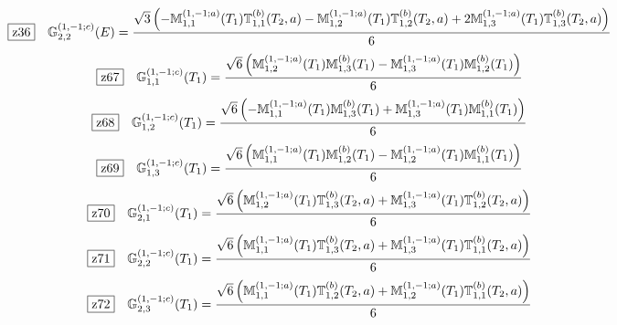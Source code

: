 \documentclass[fleqn,10pt,landscape]{jsarticle}
\begin{document}
\begin{dmath*}
\hspace*{3mm}\fbox{z36}\quad \mathbb{G}_{2,2}^{(1,-1;c)}(E)=\frac{\sqrt{3} \left(- \mathbb{M}_{1,1}^{(1,-1;a)}(T_{1}) \mathbb{T}_{1,1}^{(b)}(T_{2},a) - \mathbb{M}_{1,2}^{(1,-1;a)}(T_{1}) \mathbb{T}_{1,2}^{(b)}(T_{2},a) + 2 \mathbb{M}_{1,3}^{(1,-1;a)}(T_{1}) \mathbb{T}_{1,3}^{(b)}(T_{2},a)\right)}{6}
\end{dmath*}
\begin{dmath*}
\hspace*{3mm}\fbox{z67}\quad \mathbb{G}_{1,1}^{(1,-1;c)}(T_{1})=\frac{\sqrt{6} \left(\mathbb{M}_{1,2}^{(1,-1;a)}(T_{1}) \mathbb{M}_{1,3}^{(b)}(T_{1}) - \mathbb{M}_{1,3}^{(1,-1;a)}(T_{1}) \mathbb{M}_{1,2}^{(b)}(T_{1})\right)}{6}
\end{dmath*}
\begin{dmath*}
\hspace*{3mm}\fbox{z68}\quad \mathbb{G}_{1,2}^{(1,-1;c)}(T_{1})=\frac{\sqrt{6} \left(- \mathbb{M}_{1,1}^{(1,-1;a)}(T_{1}) \mathbb{M}_{1,3}^{(b)}(T_{1}) + \mathbb{M}_{1,3}^{(1,-1;a)}(T_{1}) \mathbb{M}_{1,1}^{(b)}(T_{1})\right)}{6}
\end{dmath*}
\begin{dmath*}
\hspace*{3mm}\fbox{z69}\quad \mathbb{G}_{1,3}^{(1,-1;c)}(T_{1})=\frac{\sqrt{6} \left(\mathbb{M}_{1,1}^{(1,-1;a)}(T_{1}) \mathbb{M}_{1,2}^{(b)}(T_{1}) - \mathbb{M}_{1,2}^{(1,-1;a)}(T_{1}) \mathbb{M}_{1,1}^{(b)}(T_{1})\right)}{6}
\end{dmath*}
\begin{dmath*}
\hspace*{3mm}\fbox{z70}\quad \mathbb{G}_{2,1}^{(1,-1;c)}(T_{1})=\frac{\sqrt{6} \left(\mathbb{M}_{1,2}^{(1,-1;a)}(T_{1}) \mathbb{T}_{1,3}^{(b)}(T_{2},a) + \mathbb{M}_{1,3}^{(1,-1;a)}(T_{1}) \mathbb{T}_{1,2}^{(b)}(T_{2},a)\right)}{6}
\end{dmath*}
\begin{dmath*}
\hspace*{3mm}\fbox{z71}\quad \mathbb{G}_{2,2}^{(1,-1;c)}(T_{1})=\frac{\sqrt{6} \left(\mathbb{M}_{1,1}^{(1,-1;a)}(T_{1}) \mathbb{T}_{1,3}^{(b)}(T_{2},a) + \mathbb{M}_{1,3}^{(1,-1;a)}(T_{1}) \mathbb{T}_{1,1}^{(b)}(T_{2},a)\right)}{6}
\end{dmath*}
\begin{dmath*}
\hspace*{3mm}\fbox{z72}\quad \mathbb{G}_{2,3}^{(1,-1;c)}(T_{1})=\frac{\sqrt{6} \left(\mathbb{M}_{1,1}^{(1,-1;a)}(T_{1}) \mathbb{T}_{1,2}^{(b)}(T_{2},a) + \mathbb{M}_{1,2}^{(1,-1;a)}(T_{1}) \mathbb{T}_{1,1}^{(b)}(T_{2},a)\right)}{6}
\end{dmath*}
\end{document}
